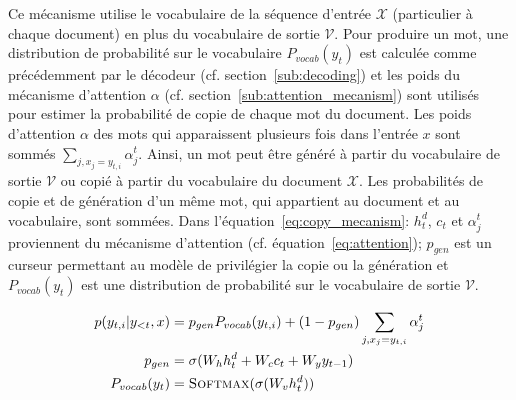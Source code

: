 Ce mécanisme utilise le vocabulaire de la séquence d'entrée $\mathcal{X}$ (particulier à chaque document) en plus du vocabulaire de sortie $\mathcal{V}$.
Pour produire un mot, une distribution de probabilité sur le vocabulaire  $P_{vocab}(y_{t})$ est calculée comme précédemment par le décodeur (cf. section~\ref{sub:decoding}) et les poids du mécanisme d'attention $\alpha$ (cf. section~\ref{sub:attention_mecanism}) sont utilisés pour estimer la probabilité de copie de chaque mot du document.
Les poids d'attention $\alpha$ des mots qui apparaissent plusieurs fois dans l'entrée $x$ sont sommés $\sum_{j,x_j=y_{t,i}} \alpha^t_j$.
Ainsi, un mot peut être généré à partir du vocabulaire de sortie $\mathcal{V}$ ou copié à partir du vocabulaire du document $\mathcal{X}$.
Les probabilités de copie et de génération d'un même mot, qui appartient au document et au vocabulaire, sont sommées.
Dans l'équation~\ref{eq:copy_mecanism}: $h^d_t$, $c_t$ et $\alpha^t_j$ proviennent du mécanisme d'attention (cf. équation~\ref{eq:attention}); $p_{gen}$ est un curseur permettant au modèle de privilégier la copie ou la génération et $P_{vocab}(y_t)$ est une distribution de probabilité sur le vocabulaire de sortie $\mathcal{V}$.


\begin{equation}\label{eq:copy_mecanism}
  \begin{split}
    p(y_{t,i}|y_{<t},x) & = p_{gen} P_{vocab}(y_{t,i}) + (1 - p_{gen}) \sum_{j,x_j=y_{t,i}} \alpha^t_j \\
    p_{gen} & = \sigma(W_h h^d_t + W_c c_t + W_y y_{t-1}) \\
    P_{vocab}(y_{t}) & = \textsc{Softmax}(\sigma(W_v h^d_t))
  \end{split}
\end{equation}


\iffalse
    
